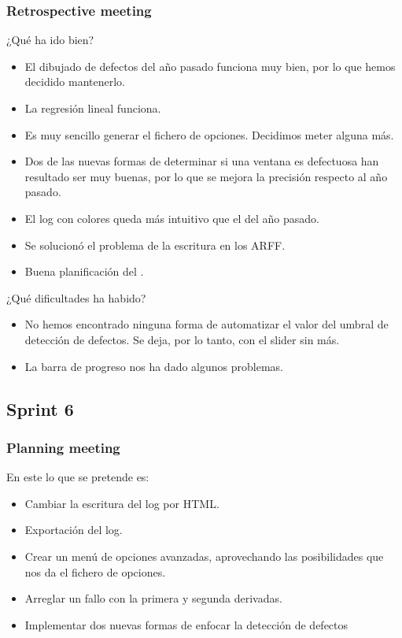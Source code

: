 \subsubsection*{Retrospective meeting}
¿Qué ha ido bien?
\begin{itemize}
 \item El dibujado de defectos del año pasado funciona muy bien, por lo que hemos decidido mantenerlo.
 \item La regresión lineal funciona.
 \item Es muy sencillo generar el fichero de opciones. Decidimos meter alguna más.
 \item Dos de las nuevas formas de determinar si una ventana es defectuosa han resultado ser muy buenas, por lo que se mejora la precisión respecto al año pasado.
 \item El log con colores queda más intuitivo que el del año pasado.
 \item Se solucionó el problema de la escritura en los ARFF.
 \item Buena planificación del \sprint{}.
\end{itemize}

¿Qué dificultades ha habido?
\begin{itemize}
 \item No hemos encontrado ninguna forma de automatizar el valor del umbral de detección de defectos. Se deja, por lo tanto, con el slider sin más.
 \item La barra de progreso nos ha dado algunos problemas.
\end{itemize}



\subsection{Sprint 6}
\subsubsection*{Planning meeting}
En este \sprint{} lo que se pretende es:

\begin{itemize}
\item Cambiar la escritura del log por HTML.
\item Exportación del log.
\item Crear un menú de opciones avanzadas, aprovechando las posibilidades que nos da el fichero de opciones.
\item Arreglar un fallo con la primera y segunda derivadas.
\item Implementar dos nuevas formas de enfocar la detección de defectos
\end{itemize}

